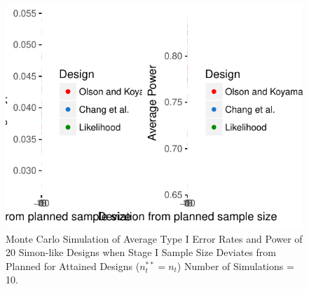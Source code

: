\documentclass[12pt]{report}\usepackage[]{graphicx}\usepackage[]{color}
\newlength{\li}\setlength{\li}{14.48pt}
\begin{document}
% 
\begin{landscape}
\begin{figure}[]
\caption{Monte Carlo Simulation of Average Type I Error Rates and Power of 20 Simon-like Designs when Stage I Sample Size Deviates from Planned for Attained Designs ($n_t^{\ast\ast} = n_t$) Number of Simulations = 10.}
\begin{Schunk}


\centerline{\includegraphics{unnamed-chunk-13-1} }

\end{Schunk}
\end{figure}
\end{landscape}
\end{document}
